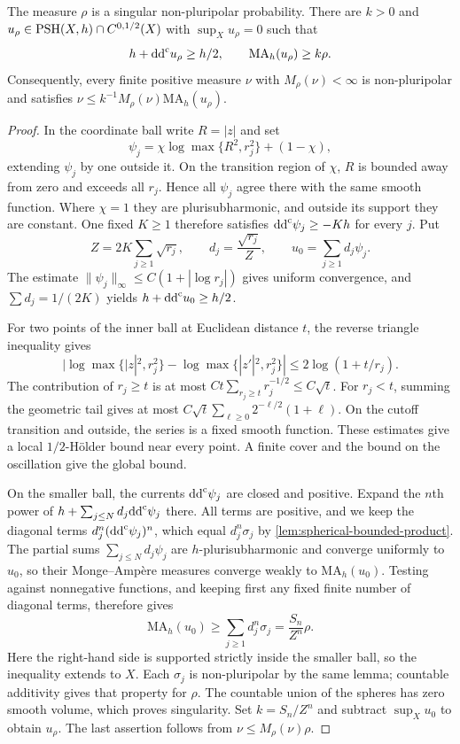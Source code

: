 \begin{proposition}\label{prop:fixed-spherical-reference}
The measure $\rho$ is a singular non-pluripolar probability. There are $k>0$ and $u_\rho\in\mathrm{PSH}(X,h)\cap C^{0,1/2}(X)$ with $\sup_Xu_\rho=0$ such that
\[
 h+\mathrm{dd}^{\mathrm{c}} u_\rho\geq h/2,\qquad
 \mathrm{MA}_h(u_\rho)\geq k\rho.
\]
Consequently, every finite positive measure $\nu$ with $M_\rho(\nu)<\infty$ is non-pluripolar and satisfies $\nu\leq k^{-1}M_\rho(\nu)\mathrm{MA}_h(u_\rho)$.
\end{proposition}
\begin{proof}
In the coordinate ball write $R=|z|$ and set
\[
 \psi_j=\chi\log\max\{R^2,r_j^2\}+(1-\chi),
\]
extending $\psi_j$ by one outside it. On the transition region of $\chi$, $R$ is bounded away from zero and exceeds all $r_j$. Hence all $\psi_j$ agree there with the same smooth function. Where $\chi=1$ they are plurisubharmonic, and outside its support they are constant. One fixed $K\geq1$ therefore satisfies $\mathrm{dd}^{\mathrm{c}}\psi_j\geq-Kh$ for every $j$. Put
\[
 Z=2K\sum_{j\geq1}\sqrt{r_j},\qquad
 d_j=\frac{\sqrt{r_j}}Z,\qquad u_0=\sum_{j\geq1}d_j\psi_j.
\]
The estimate $\|\psi_j\|_\infty\leq C(1+|\log r_j|)$ gives uniform convergence, and $\sum d_j=1/(2K)$ yields $h+\mathrm{dd}^{\mathrm{c}} u_0\geq h/2$.

For two points of the inner ball at Euclidean distance $t$, the reverse triangle inequality gives
\[
 |\log\max\{|z|^2,r_j^2\}-\log\max\{|z'|^2,r_j^2\}|
 \leq2\log(1+t/r_j).
\]
The contribution of $r_j\geq t$ is at most $Ct\sum_{r_j\geq t}r_j^{-1/2}\leq C\sqrt t$. For $r_j<t$, summing the geometric tail gives at most $C\sqrt t\sum_{\ell\geq0}2^{-\ell/2}(1+\ell)$. On the cutoff transition and outside, the series is a fixed smooth function. These estimates give a local $1/2$-H\"older bound near every point. A finite cover and the bound on the oscillation give the global bound.

On the smaller ball, the currents $\mathrm{dd}^{\mathrm{c}}\psi_j$ are closed and positive. Expand the $n$th power of $h+\sum_{j\leq N}d_j\mathrm{dd}^{\mathrm{c}}\psi_j$ there. All terms are positive, and we keep the diagonal terms $d_j^n(\mathrm{dd}^{\mathrm{c}}\psi_j)^n$, which equal $d_j^n\sigma_j$ by \cref{lem:spherical-bounded-product}. The partial sums $\sum_{j\leq N}d_j\psi_j$ are $h$-plurisubharmonic and converge uniformly to $u_0$, so their Monge--Amp\`ere measures converge weakly to $\mathrm{MA}_h(u_0)$. Testing against nonnegative functions, and keeping first any fixed finite number of diagonal terms, therefore gives
\[
 \mathrm{MA}_h(u_0)\geq\sum_{j\geq1}d_j^n\sigma_j
                       =\frac{S_n}{Z^n}\rho.
\]
Here the right-hand side is supported strictly inside the smaller ball, so the inequality extends to $X$. Each $\sigma_j$ is non-pluripolar by the same lemma; countable additivity gives that property for $\rho$. The countable union of the spheres has zero smooth volume, which proves singularity. Set $k=S_n/Z^n$ and subtract $\sup_Xu_0$ to obtain $u_\rho$. The last assertion follows from $\nu\leq M_\rho(\nu)\rho$.
\end{proof}

